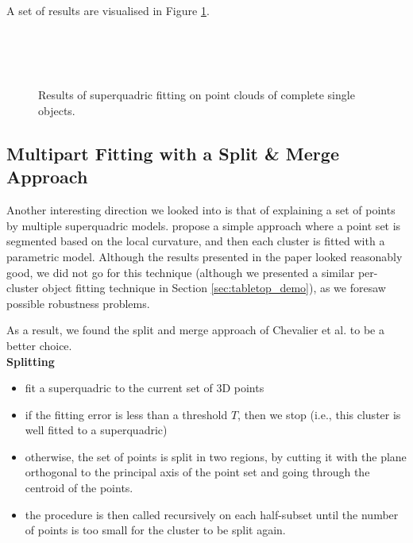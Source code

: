 \documentclass{article}
\begin{document}
A set of results are visualised in Figure \ref{fig:fitting_results}.

\begin{figure}
\centering
{} \\
 \\
 \\

\caption {Results of superquadric fitting on point clouds of complete single objects.}
\label{fig:fitting_results}
\end{figure}


\subsection {Multipart Fitting with a Split \& Merge Approach}

Another interesting direction we looked into is that of explaining a set of points by multiple superquadric models. \cite{doi:10.1117/1.1762516} propose a simple approach where a point set is segmented based on the local curvature, and then each cluster is fitted with a parametric model. Although the results presented in the paper looked reasonably good, we did not go for this technique (although we presented a similar per-cluster object fitting technique in Section \ref{sec:tabletop_demo}), as we foresaw possible robustness problems.

As a result, we found the split and merge approach of Chevalier et al. \cite{conf/wscg/ChevalierJB03} to be a better choice. \\

\textbf{Splitting}
\begin{itemize}
	\item {fit a superquadric to the current set of 3D points}
	\item {if the fitting error is less than a threshold $T$, then we stop (i.e., this cluster is well fitted to a superquadric)}
	\item {otherwise, the set of points is split in two regions, by cutting it with the plane orthogonal to the principal axis of the point set and going through the centroid of the points.}
	\item {the procedure is then called recursively on each half-subset until the number of points is too small for the cluster to be split again.}
\end{itemize}
\end{document}
